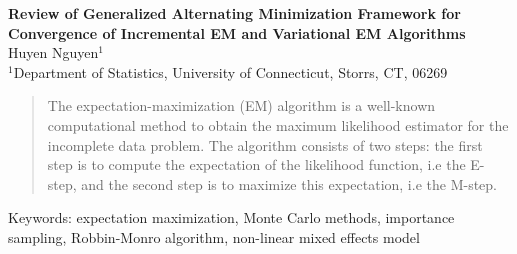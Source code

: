 \documentclass[11pt]{article}
\begin{document}
	\begin{center}
		\textbf{\large Review of Generalized Alternating Minimization Framework for Convergence of Incremental EM and Variational EM Algorithms}\\
		{Huyen Nguyen$^1$ \\
			$^1$Department of Statistics, University of Connecticut, Storrs, CT, 06269}
	\end{center}
	\begin{abstract}
		The expectation-maximization (EM) algorithm is a well-known computational method to obtain the maximum likelihood estimator for the incomplete data problem. The algorithm consists of two steps: the first step is to compute the expectation of the likelihood function, i.e the E-step, and the second step is to maximize this expectation, i.e the M-step. 
	\end{abstract}
	
	\noindent
	Keywords: expectation maximization, Monte Carlo methods, importance sampling, Robbin-Monro algorithm, non-linear mixed effects model
\end{document}
